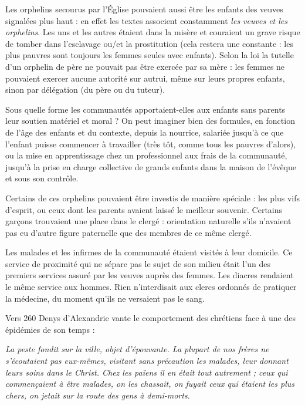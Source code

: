  Les orphelins secourus par l'Église pouvaient aussi être les enfants des veuves signalées plus haut : en effet les textes associent constamment \emph{les veuves et les orphelins}. Les uns et les autres étaient dans la misère et couraient un grave risque de tomber dans l'esclavage ou/et la prostitution (cela restera une constante : les plus pauvres sont toujours les femmes seules avec enfants). Selon la loi la tutelle d'un orphelin de père ne pouvait pas être exercée par sa mère : les femmes ne pouvaient exercer aucune autorité sur autrui, même sur leurs propres enfants, sinon par délégation (du père ou du tuteur).

 Sous quelle forme les communautés apportaient-elles aux enfants sans parents leur soutien matériel et moral ? On peut imaginer bien des formules, en fonction de l'âge des enfants et du contexte, depuis la nourrice, salariée jusqu'à ce que l'enfant puisse commencer à travailler (très tôt, comme tous les pauvres d'alors), ou la mise en apprentissage chez un professionnel aux frais de la communauté, jusqu'à la prise en charge collective de grands enfants dans la maison de l'évêque et sous son contrôle. 

 Certains de ces orphelins pouvaient être investis de manière spéciale : les plus vifs d'esprit, ou ceux dont les parents avaient laissé le meilleur souvenir. Certains garçons trouvaient une place dans le clergé : orientation naturelle s'ils n'avaient pas eu d'autre figure paternelle que des membres de ce même clergé.



Les malades et les infirmes de la communauté étaient visités à leur domicile. Ce service de proximité qui ne sépare pas le sujet de son milieu était l'un des premiers services assuré par les veuves auprès des femmes. Les diacres rendaient le même service aux hommes. Rien n'interdisait aux clercs ordonnés de pratiquer la médecine, du moment qu'ils ne versaient pas le sang. 

Vers 260 Denys d'Alexandrie vante le comportement des chrétiens face à une des épidémies de son temps : 

\begin{displayquote}
\emph{La peste fondit sur la ville, objet d'épouvante. La plupart de nos frères ne s'écoutaient pas eux-mêmes, visitant sans précaution les malades, leur donnant leurs soins dans le Christ. Chez les païens il en était tout autrement ; ceux qui commençaient à être malades, on les chassait, on fuyait ceux qui étaient les plus chers, on jetait sur la route des gens à demi-morts.}
\end{displayquote}

